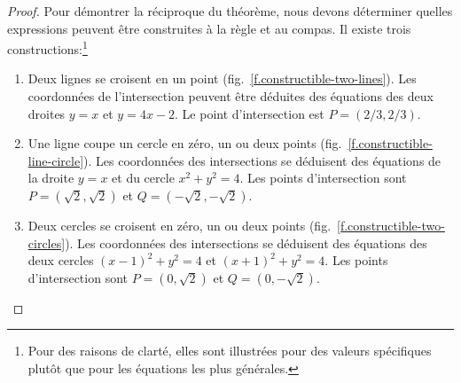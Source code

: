 \begin{proof}
\medskip

Pour démontrer la réciproque du théorème, nous devons déterminer quelles expressions peuvent être construites à la règle et au compas. Il existe trois constructions:\footnote{Pour des raisons de clarté, elles sont illustrées pour des valeurs spécifiques plutôt que pour les équations les plus générales.}

\begin{enumerate}
\item Deux lignes se croisent en un point (fig.~\ref{f.constructible-two-lines}). Les coordonnées de l'intersection peuvent être déduites des équations des deux droites
$y=x$ et $y=4x-2$. Le point d'intersection est $P= (2/3, 2/3)$.

\item Une ligne coupe un cercle en zéro, un ou deux points (fig.~\ref{f.constructible-line-circle}). Les coordonnées des intersections se déduisent des équations de la droite $y=x$ et du cercle $x^2+y^2=4$. Les points d'intersection sont
$P=(\sqrt{2}, \sqrt{2})$ et $Q=(-\sqrt{2}, -\sqrt{2})$.

\item Deux cercles se croisent en zéro, un ou deux points (fig.~\ref{f.constructible-two-circles}). Les coordonnées des intersections se déduisent des équations des deux cercles $(x-1)^2+y^2=4$ et $(x+1)^2+y^2=4$. Les points d'intersection sont $P=(0,\sqrt{2})$ et $Q=(0,-\sqrt{2})$.\qedhere
\end{enumerate}
\end{proof}

\vspace{0.4cm}

